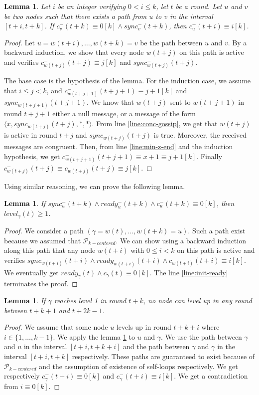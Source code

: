 \documentclass[11pt,letterpaper]{article}
\newtheorem{lem}[thm]{Lemma}
\newcommand{\cent}{\gamma}
\begin{document}
\begin{lem} \label{lem:conc-safety}
	Let $i$ be an integer verifying $0 < i \leq k$, let $t$ be a round. Let $u$ and $v$ be two nodes such that there exists a path from $u$ to $v$ in the interval $[t+i,t+k]$.
	If $c^-_v(t+k) \equiv 0 [k] \wedge sync^-_v(t+k)$, then $c_u^-(t+i) \equiv i [k]$.
\end{lem}
\begin{proof}
	Let $u = w(t+i), \dots, w(t+k) = v$ be the path between $u$ and $v$.
	By a backward induction, we show that every node $w(t+j)$ on this path is active
	and verifies $c_{w(t+j)}^-(t+j) \equiv j [k]$ and $sync_{w(t+j)}^-(t+j)$.

	The base case is the hypothesis of the lemma.
	For the induction case, we assume that $i \leq j < k$, and $c_{w(t+j+1)}^-(t+j+1) \equiv j+1 [k]$ and $sync_{w(t+j+1)}^-(t+j+1)$.
	We know that $w(t+j)$ sent to $w(t+j+1)$ in round $t+j+1$ either a null message, or a message of the form $\langle x, sync_{w(t+j)}(t+j), *, * \rangle$.
	From line \ref{line:conc-gossip}, we get that $w(t+j)$ is active in round $t+j$ and $sync_{w(t+j)}(t+j)$ is true. Moreover, the received messages are congruent.
	Then, from line \ref{line:min-z-end} and the induction hypothesis, we get $c_{w(t+j+1)}^-(t+j+1) \equiv x+1 \equiv j+1 [k]$.
	Finally $c_{w(t+j)}^-(t+j) \equiv c_{w(t+j)}(t+j) \equiv j [k]$.
\end{proof}

\noindent Using similar reasoning, we can prove the following lemma.
\begin{lem} \label{lem:conc-safety-bis}
	If $sync_u^-(t+k) \wedge ready_u^-(t+k) \wedge c_u^-(t+k) \equiv 0 [k]$, then $level_\cent(t) \geq 1$.
\end{lem}
\begin{proof}
	We consider a path $(\cent = w(t), \dots, w(t+k) = u)$. Such a path exist because we assumed that $\mathcal{P}_{k-centered}$.
	We can show using a backward induction along this path that any node $w(t+i)$ with $0 \leq i < k$ on this path is active and verifies
	$sync_{w(t+i)}(t+i) \wedge ready_{w(t+i)}(t+i) \wedge c_{w(t+i)}(t+i) \equiv i [k]$.
	We eventually get $ready_\cent(t) \wedge c_\cent(t) \equiv 0 [k]$. The line \ref{line:init-ready} terminates the proof.
\end{proof}

\begin{lem} \label{lem:no-close-level2}
	If $\cent$ reaches level 1 in round $t+k$, no node can level up in any round between $t+k+1$ and $t+2k-1$.
\end{lem}
\begin{proof}
	We assume that some node $u$ levels up in round $t+k+i$ where $i \in \{1, \dots, k-1\}$.
	We apply the lemma \ref{lem:conc-safety} to $u$ and $\cent$.
	We use the path between $\cent$ and $u$ in the interval $[t+i,t+k+i]$ and the path between $\cent$ and $\cent$ in the interval $[t+i,t+k]$ respectively.
	These paths are guaranteed to exist because of $\mathcal{P}_{k-centered}$ and the assumption of existence of self-loops respectively.
	We get respectively $c_\cent^-(t+i) \equiv 0 [k]$ and $c_\cent^-(t+i) \equiv i [k]$.
	We get a contradiction from $i \equiv 0 [k]$.
\end{proof}
\end{document}
